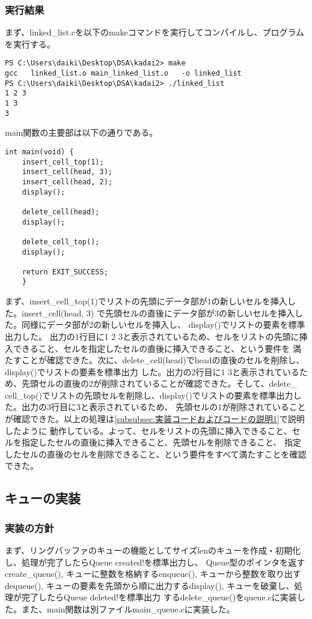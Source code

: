 \documentclass{ltjsarticle}
\begin{document}
\subsubsection{実行結果}\label{subsubsec:実行結果1}
まず、linked\_list.cを以下のmakeコマンドを実行してコンパイルし、プログラムを実行する。
\begin{lstlisting}
PS C:\Users\daiki\Desktop\DSA\kadai2> make
gcc   linked_list.o main_linked_list.o   -o linked_list
PS C:\Users\daiki\Desktop\DSA\kadai2> ./linked_list
1 2 3 
1 3
3  
\end{lstlisting}
main関数の主要部は以下の通りである。
\begin{lstlisting}
int main(void) {
    insert_cell_top(1);
    insert_cell(head, 3);
    insert_cell(head, 2);
    display();
    
    delete_cell(head);
    display();
    
    delete_cell_top();
    display();
    
    return EXIT_SUCCESS;
    }    
\end{lstlisting}
まず、insert\_cell\_top(1)でリストの先頭にデータ部が1の新しいセルを挿入した。insert\_cell(head, 3)
で先頭セルの直後にデータ部が3の新しいセルを挿入した。同様にデータ部が2の新しいセルを挿入し、
display()でリストの要素を標準出力した。
出力の1行目に1 2 3と表示されているため、セルをリストの先頭に挿入できること、セルを指定したセルの直後に挿入できること、という要件を
満たすことが確認できた。次に、delete\_cell(head)でheadの直後のセルを削除し、display()でリストの要素を標準出力
した。出力の2行目に1 3と表示されているため、先頭セルの直後の2が削除されていることが確認できた。そして、delete\_
cell\_top()でリストの先頭セルを削除し、display()でリストの要素を標準出力した。出力の3行目に3と表示されているため、
先頭セルの1が削除されていることが確認できた。以上の処理は\ref{subsubsec:実装コードおよびコードの説明1}で説明したように
動作している。よって、セルをリストの先頭に挿入できること、セルを指定したセルの直後に挿入できること、先頭セルを削除できること、
指定したセルの直後のセルを削除できること、という要件をすべて満たすことを確認できた。
\subsection{キューの実装}
\subsubsection{実装の方針}\label{subsubsec:実装の方針2}
まず、リングバッファのキューの機能としてサイズlenのキューを作成・初期化し、処理が完了したらQueue created!を標準出力し、
Queue型のポインタを返すcreate_queue(), キューに整数を格納するenqueue(), キューから整数を取り出す
dequeue(), キューの要素を先頭から順に出力するdisplay(), キューを破棄し、処理が完了したらQueue deleted!を標準出力
するdelete_queue()をqueue.cに実装した。また、main関数は別ファイルmain\_queue.cに実装した。
\end{document}
